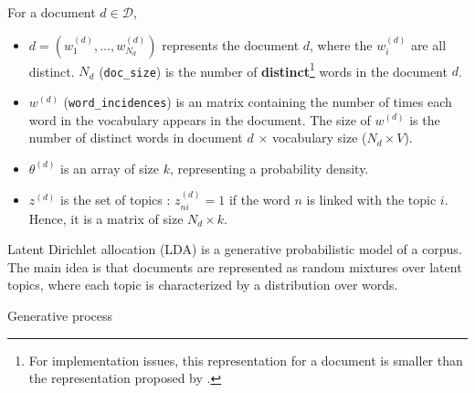 \documentclass{article}
\begin{document}
For a document $d \in \mathcal{D}$,
\begin{itemize}  
\setlength\itemsep{-0.2em}
  \item $d = (w_1^{(d)}, \ldots, w_{N_d}^{(d)})$ represents the document $d$, where the $w_i^{(d)}$ are all distinct. $N_d$ (\verb"doc_size") is the number of \textbf{distinct}\footnote{For implementation issues, this representation for a document is smaller than the representation proposed by \cite{BNJ03}.} words in the document $d$.
  \item $w^{(d)}$ (\verb"word_incidences") is an matrix containing the number of times each word in the vocabulary appears in the document. The size of $w^{(d)}$ is the number of distinct words in document $d$ $\times$ vocabulary size ($N_d \times V$).
 \item $\theta^{(d)}$ is an array of size $k$, representing a probability density.
 \item $z^{(d)}$ is the set of topics : $z_{ni}^{(d)} =  1$ if the word $n$ is linked with the topic $i$. Hence, it is a matrix of size $N_d \times k$.
\end{itemize}

\medskip

Latent Dirichlet allocation (LDA) is a generative probabilistic model of a corpus. The main idea is that documents are represented as random mixtures over latent topics, where each topic is characterized by a distribution over words. 

\begin{algorithm}
\caption{Generative process}
\end{algorithm}
\end{document}
